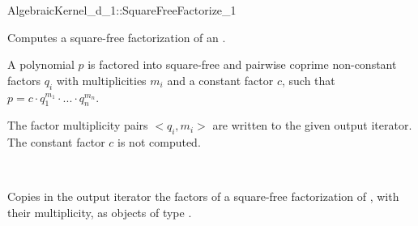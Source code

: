 \begin{ccRefFunctionObjectConcept}{AlgebraicKernel_d_1::SquareFreeFactorize_1}

\ccDefinition
Computes a square-free factorization of an
.

A polynomial $p$ is factored into square-free and pairwise 
coprime non-constant factors $q_i$ with multiplicities $m_i$ 
and a constant factor $c$, such that 
$p = c  \cdot  q_1^{m_1}  \cdot  ...  \cdot  q_n^{m_n}$.

The factor multiplicity pairs $<q_i,m_i>$ are written to the 
given output iterator. The constant factor $c$ is not computed. 

\ccRefines 
{}\\

\ccOperations
{}

{Copies in the output iterator the factors of a square-free 
factorization of , with their multiplicity, as objects of type 
.}

\ccSeeAlso
{}\\
\\

\end{ccRefFunctionObjectConcept}
